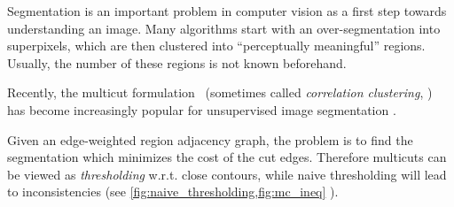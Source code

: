 Segmentation is an important problem in computer vision as a first step
towards understanding an image. Many algorithms start with an over-segmentation
into superpixels, which are then clustered into ``perceptually meaningful''
regions.
Usually, the number of these regions is not known beforehand.

Recently, the multicut formulation~\cite{chopra_1993_mp} 
(sometimes called \emph{correlation clustering}, \cite{bansal_2004_ml}) 
has become increasingly popular for unsupervised
image segmentation \cite{andres_2011_iccv,yarkony_2012_eccv,alush_2013_simbad}.


Given an edge-weighted region adjacency graph,
the problem is to find the segmentation which
minimizes the cost of the cut edges.
Therefore multicuts can be viewed as \emph{thresholding} w.r.t. close contours, while
naive thresholding will lead to inconsistencies 
(see \cref{fig:naive_thresholding,fig:mc_ineq} ).


